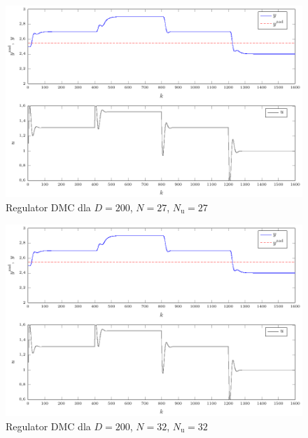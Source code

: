 \begin{figure}[tb] 
\centering 
\includegraphics[scale=1]{rysunki/zapisz_pdf/DMC_D=200.000_N=27.00_Nu=27.00.pdf} 
\caption{Regulator DMC dla $D=200$, $N=27$, $N_{\mathrm{u}}=27$} 
\label{r_pgfplots_DMC_D=200.000_N=27.00_Nu=27.00} 
\end{figure}

\begin{figure}[tb] 
\centering 
\includegraphics[scale=1]{rysunki/zapisz_pdf/DMC_D=200.000_N=32.00_Nu=32.00.pdf} 
\caption{Regulator DMC dla $D=200$, $N=32$, $N_{\mathrm{u}}=32$} 
\label{r_pgfplots_DMC_D=200.000_N=32.00_Nu=32.00} 
\end{figure}

